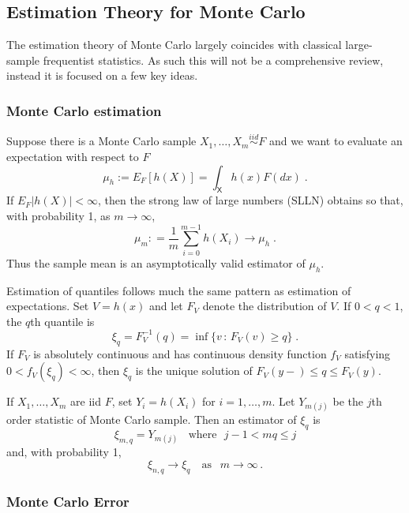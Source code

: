 \documentclass[12pt]{article}
\theoremstyle{plain}
\theoremstyle{definition}
\theoremstyle{remark}
\newcommand{\sX}{\mathsf{X}}
\begin{document}
\subsection{Estimation Theory for Monte Carlo}
\label{gofmc:sec:Theory}

The estimation theory of Monte Carlo largely coincides with
classical large-sample frequentist statistics.  As such this will not
be a comprehensive review, instead it is focused on a few key ideas.

\subsubsection{Monte Carlo estimation}

Suppose there is a Monte Carlo sample
$X_{1},\ldots, X_{m} \stackrel{iid}{\sim} F$ and we want to evaluate
an expectation with respect to $F$
\[
\mu_{h} := E_{F} [h (X)] = \int_{\sX} h(x) F(dx) \; .
\]
If $E_{F}|h(X)| < \infty$, then the strong law of large numbers (SLLN)
obtains so that, with probability 1, as $m \to \infty$,
\begin{equation}
\label{gofmc:eq:iid slln}
\mu_{m} : = \frac{1}{m} \sum_{i=0}^{m-1} h(X_{i}) \to \mu_{h} \; .
\end{equation}
Thus the sample mean is an asymptotically valid estimator of $\mu_h$.

Estimation of quantiles follows much the same pattern as estimation of
expectations.  Set $V=h(x)$ and let $F_V$ denote the distribution of
$V$.  If $0 < q < 1$, the $q$th quantile is
\[
\xi_{q} = F_{V}^{-1}(q) = \inf \{ v \, : \, F_{V}(v) \ge q\} \; .
\]
If $F_V$ is absolutely continuous and has continuous density function
$f_V$ satisfying $0 < f_V(\xi_q) < \infty$, then $\xi_q$ is the unique
solution of $F_V(y-) \le q \le F_V(y)$.

If $X_1, \ldots, X_m$ are iid $F$, set $Y_i = h(X_i)$ for
$i=1, \ldots, m$.  Let $Y_{m(j)}$ be the $j$th order statistic of
Monte Carlo sample.  Then an estimator of $\xi_q$ is
\begin{equation}
\label{gofmc:eq: sample quantile}
\xi_{m,q} = Y_{m(j)}~~~~\text{where}~~~j-1 < mq \le j
\end{equation}
and, with probability 1,
\begin{equation}
\label{gofmc:eq:quantile convergence}
\xi_{n,q} \to \xi_q ~~~\text{ as } ~~ m \to \infty\, .
\end{equation}

\subsubsection{Monte Carlo Error}
\end{document}
